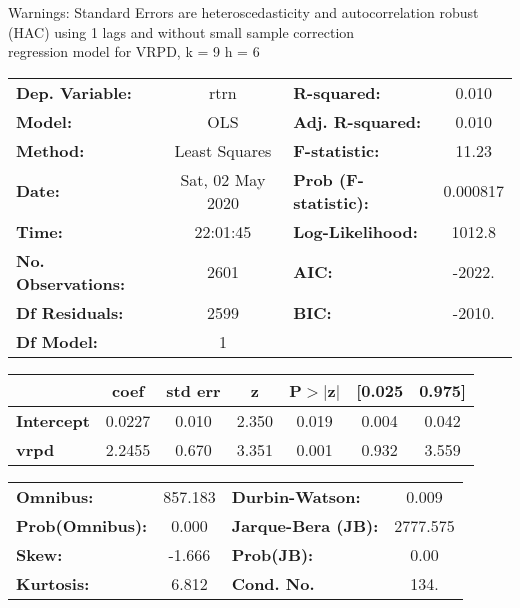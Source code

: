 Warnings: \newline
 [1] Standard Errors are heteroscedasticity and autocorrelation robust (HAC) using 1 lags and without small sample correction\\ 

regression model for VRPD, k = 9 h = 6\begin{center}
\begin{tabular}{lclc}
\toprule
\textbf{Dep. Variable:}    &       rtrn       & \textbf{  R-squared:         } &     0.010   \\
\textbf{Model:}            &       OLS        & \textbf{  Adj. R-squared:    } &     0.010   \\
\textbf{Method:}           &  Least Squares   & \textbf{  F-statistic:       } &     11.23   \\
\textbf{Date:}             & Sat, 02 May 2020 & \textbf{  Prob (F-statistic):} &  0.000817   \\
\textbf{Time:}             &     22:01:45     & \textbf{  Log-Likelihood:    } &    1012.8   \\
\textbf{No. Observations:} &        2601      & \textbf{  AIC:               } &    -2022.   \\
\textbf{Df Residuals:}     &        2599      & \textbf{  BIC:               } &    -2010.   \\
\textbf{Df Model:}         &           1      & \textbf{                     } &             \\
\bottomrule
\end{tabular}
\begin{tabular}{lcccccc}
                   & \textbf{coef} & \textbf{std err} & \textbf{z} & \textbf{P$> |$z$|$} & \textbf{[0.025} & \textbf{0.975]}  \\
\midrule
\textbf{Intercept} &       0.0227  &        0.010     &     2.350  &         0.019        &        0.004    &        0.042     \\
\textbf{vrpd}      &       2.2455  &        0.670     &     3.351  &         0.001        &        0.932    &        3.559     \\
\bottomrule
\end{tabular}
\begin{tabular}{lclc}
\textbf{Omnibus:}       & 857.183 & \textbf{  Durbin-Watson:     } &    0.009  \\
\textbf{Prob(Omnibus):} &   0.000 & \textbf{  Jarque-Bera (JB):  } & 2777.575  \\
\textbf{Skew:}          &  -1.666 & \textbf{  Prob(JB):          } &     0.00  \\
\textbf{Kurtosis:}      &   6.812 & \textbf{  Cond. No.          } &     134.  \\
\bottomrule
\end{tabular}
\end{center}

